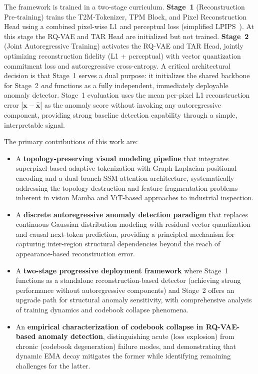 \documentclass[lettersize,journal]{IEEEtran}
\begin{document}
The framework is trained in a two-stage curriculum. \textbf{Stage~1} (Reconstruction Pre-training) trains the T2M-Tokenizer, TPM Block, and Pixel Reconstruction Head using a combined pixel-wise L1 and perceptual loss (simplified LPIPS~\cite{zhang2018lpips}). At this stage the RQ-VAE and TAR Head are initialized but not trained. \textbf{Stage~2} (Joint Autoregressive Training) activates the RQ-VAE and TAR Head, jointly optimizing reconstruction fidelity (L1 + perceptual) with vector quantization commitment loss and autoregressive cross-entropy. A critical architectural decision is that Stage~1 serves a dual purpose: it initializes the shared backbone for Stage~2 \textit{and} functions as a fully independent, immediately deployable anomaly detector. Stage~1 evaluation uses the mean per-pixel L1 reconstruction error $|\mathbf{x} - \hat{\mathbf{x}}|$ as the anomaly score without invoking any autoregressive component, providing strong baseline detection capability through a simple, interpretable signal.

The primary contributions of this work are:

\begin{itemize}
\item A \textbf{topology-preserving visual modeling pipeline} that integrates superpixel-based adaptive tokenization with Graph Laplacian positional encoding and a dual-branch SSM-attention architecture, systematically addressing the topology destruction and feature fragmentation problems inherent in vision Mamba and ViT-based approaches to industrial inspection.
\item A \textbf{discrete autoregressive anomaly detection paradigm} that replaces continuous Gaussian distribution modeling with residual vector quantization and causal next-token prediction, providing a principled mechanism for capturing inter-region structural dependencies beyond the reach of appearance-based reconstruction error.
\item A \textbf{two-stage progressive deployment framework} where Stage~1 functions as a standalone reconstruction-based detector (achieving strong performance without autoregressive components) and Stage~2 offers an upgrade path for structural anomaly sensitivity, with comprehensive analysis of training dynamics and codebook collapse phenomena.
\item An \textbf{empirical characterization of codebook collapse in RQ-VAE-based anomaly detection}, distinguishing acute (loss explosion) from chronic (codebook degeneration) failure modes, and demonstrating that dynamic EMA decay mitigates the former while identifying remaining challenges for the latter.
\end{itemize}
\end{document}
